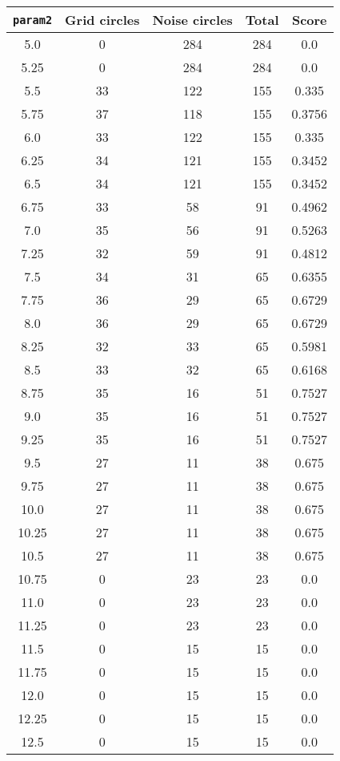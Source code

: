 \documentclass[letterpaper, 12pt]{article}
\begin{document}
\begin{longtable}{|c|c|c|c|c|}
\hline
\textbf{\texttt{param2}} & \textbf{Grid circles} & \textbf{Noise circles} & \textbf{Total} & \textbf{Score} \\
\hline
5.0 & 0 & 284 & 284 & 0.0 \\
\hline
5.25 & 0 & 284 & 284 & 0.0 \\
\hline
5.5 & 33 & 122 & 155 & 0.335 \\
\hline
5.75 & 37 & 118 & 155 & 0.3756 \\
\hline
6.0 & 33 & 122 & 155 & 0.335 \\
\hline
6.25 & 34 & 121 & 155 & 0.3452 \\
\hline
6.5 & 34 & 121 & 155 & 0.3452 \\
\hline
6.75 & 33 & 58 & 91 & 0.4962 \\
\hline
7.0 & 35 & 56 & 91 & 0.5263 \\
\hline
7.25 & 32 & 59 & 91 & 0.4812 \\
\hline
7.5 & 34 & 31 & 65 & 0.6355 \\
\hline
7.75 & 36 & 29 & 65 & 0.6729 \\
\hline
8.0 & 36 & 29 & 65 & 0.6729 \\
\hline
8.25 & 32 & 33 & 65 & 0.5981 \\
\hline
8.5 & 33 & 32 & 65 & 0.6168 \\
\hline
8.75 & 35 & 16 & 51 & 0.7527 \\
\hline
9.0 & 35 & 16 & 51 & 0.7527 \\
\hline
9.25 & 35 & 16 & 51 & 0.7527 \\
\hline
9.5 & 27 & 11 & 38 & 0.675 \\
\hline
9.75 & 27 & 11 & 38 & 0.675 \\
\hline
10.0 & 27 & 11 & 38 & 0.675 \\
\hline
10.25 & 27 & 11 & 38 & 0.675 \\
\hline
10.5 & 27 & 11 & 38 & 0.675 \\
\hline
10.75 & 0 & 23 & 23 & 0.0 \\
\hline
11.0 & 0 & 23 & 23 & 0.0 \\
\hline
11.25 & 0 & 23 & 23 & 0.0 \\
\hline
11.5 & 0 & 15 & 15 & 0.0 \\
\hline
11.75 & 0 & 15 & 15 & 0.0 \\
\hline
12.0 & 0 & 15 & 15 & 0.0 \\
\hline
12.25 & 0 & 15 & 15 & 0.0 \\
\hline
12.5 & 0 & 15 & 15 & 0.0 \\

\end{longtable}
\end{document}
